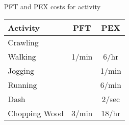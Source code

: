 \begin{SHTable}{PFT and PEX costs for activity}
	\begin{tabular}{lcc}

	Activity		&	PFT & PEX \\	
\hline
	Crawling		&	   &	  \\
	Walking			& 1/min	& 6/hr \\
	Jogging			&		& 1/min \\
	Running			&	   & 6/min \\
	Dash			&		& 2/sec \\
	Chopping Wood	 & 3/min & 18/hr \\
    \end{tabular}
    \caption{PFT and PEX costs for activity}
\end{SHTable}
